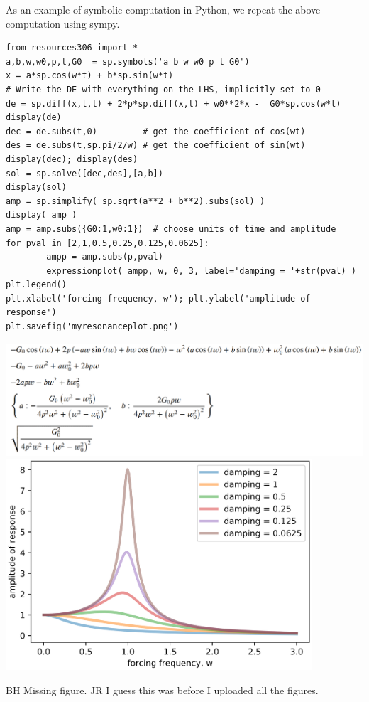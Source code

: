 \documentclass[12pt]{book}
\begin{document}
As an example of symbolic computation in Python, 
we repeat the above computation using sympy.

\begin{small}
\begin{verbatim}
from resources306 import *
a,b,w,w0,p,t,G0  = sp.symbols('a b w w0 p t G0')
x = a*sp.cos(w*t) + b*sp.sin(w*t)
# Write the DE with everything on the LHS, implicitly set to 0
de = sp.diff(x,t,t) + 2*p*sp.diff(x,t) + w0**2*x -  G0*sp.cos(w*t)  
display(de)
dec = de.subs(t,0)         # get the coefficient of cos(wt)
des = de.subs(t,sp.pi/2/w) # get the coefficient of sin(wt)
display(dec); display(des)
sol = sp.solve([dec,des],[a,b])
display(sol)
amp = sp.simplify( sp.sqrt(a**2 + b**2).subs(sol) )
display( amp )
amp = amp.subs({G0:1,w0:1})  # choose units of time and amplitude
for pval in [2,1,0.5,0.25,0.125,0.0625]:
        ampp = amp.subs(p,pval)
        expressionplot( ampp, w, 0, 3, label='damping = '+str(pval) )
plt.legend()
plt.xlabel('forcing frequency, w'); plt.ylabel('amplitude of response')
plt.savefig('myresonanceplot.png')
\end{verbatim}
\end{small}

\includegraphics[width=6.5in]{additional_figures/forcing_and_resonance_symbols.png}
\includegraphics[width=4.5in]{additional_figures/forcing_and_resonance_plot.png}

{\color{teal}BH Missing figure. JR I guess this was before I uploaded all the figures.}
\end{document}
